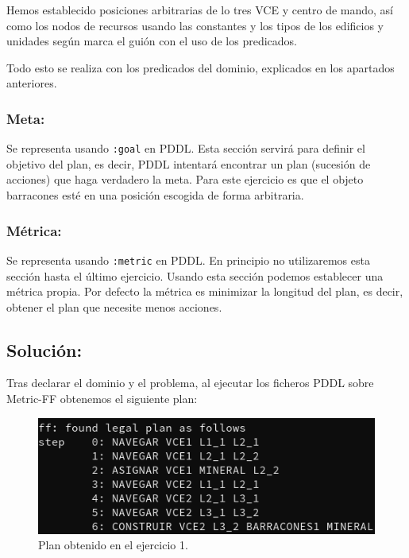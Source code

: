 \documentclass[10pt, spanish]{article}
\begin{document}
Hemos establecido posiciones arbitrarias de lo tres VCE y centro de mando, así como los nodos de recursos usando las constantes y los tipos de los edificios y unidades según marca el guión con el uso de los predicados.

Todo esto se realiza con los predicados del dominio, explicados en los apartados anteriores.

\subsubsection{Meta:}

Se representa usando \texttt{:goal} en PDDL. Esta sección servirá para definir el objetivo del plan, es decir, PDDL intentará encontrar un plan (sucesión de acciones) que haga verdadero la meta. Para este ejercicio es que el objeto barracones esté en una posición escogida de forma arbitraria.

\subsubsection{Métrica:}

Se representa usando \texttt{:metric} en PDDL. En principio no utilizaremos esta sección hasta el último ejercicio. Usando esta sección podemos establecer una métrica propia. Por defecto la métrica es minimizar la longitud del plan, es decir, obtener el plan que necesite menos acciones.


\subsection{Solución:}

\begin{multicols}{2}

Tras declarar el dominio y el problema, al ejecutar los ficheros PDDL sobre Metric-FF obtenemos el siguiente plan:

\begin{figure}[H]
	\centering
	\vspace*{-1cm}\includegraphics[scale=0.3]{plan1.png}
	\caption{Plan obtenido en el ejercicio 1.}
	\label{plan1}
\end{figure}

\end{multicols}
\end{document}
